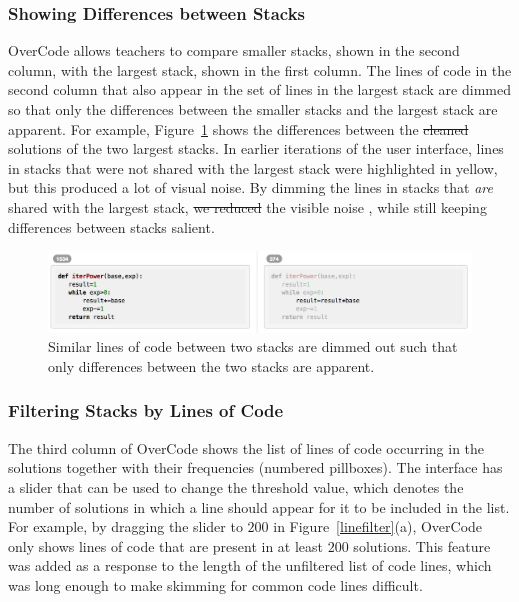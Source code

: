 \documentclass[12pt,twoside]{mitthesis}
\providecommand{\DIFaddtex}[1]{{\protect\color{blue}\uwave{#1}}} %
\providecommand{\DIFdeltex}[1]{{\protect\color{red}\sout{#1}}}                      %
\providecommand{\DIFaddbegin}{} %
\providecommand{\DIFaddend}{} %
\providecommand{\DIFdelbegin}{} %
\providecommand{\DIFdelend}{} %
\providecommand{\DIFadd}[1]{\texorpdfstring{\DIFaddtex{#1}}{#1}} %
\providecommand{\DIFdel}[1]{\texorpdfstring{\DIFdeltex{#1}}{}} %
\begin{document}
{{{{{{{{{{\subsubsection{Showing Differences between Stacks} OverCode allows teachers to compare smaller stacks, shown in the second column, with the largest stack, shown in the first column. The lines of code in the second column that also appear in the set of lines in the largest stack are dimmed so that only the differences between the smaller stacks and the largest stack are apparent. For example, Figure~\ref{stackdifferences} shows the differences between the \DIFdelbegin \DIFdel{cleaned }\DIFdelend \DIFaddbegin \DIFadd{platonic }\DIFaddend solutions of the two largest stacks. In earlier iterations of the user interface, lines in stacks that were not shared with the largest stack were highlighted in yellow, but this produced a lot of visual noise. By dimming the lines in stacks that \textit{are} shared with the largest stack, \DIFdelbegin \DIFdel{we reduced }\DIFdelend the visible noise \DIFaddbegin \DIFadd{is reduced}\DIFaddend , while still keeping differences between stacks salient.

\begin{figure}
\centering
\includegraphics[scale=0.42]{Body/figures/overcode/lineFadingScreenshot}
\caption{Similar lines of code between two stacks are dimmed out such that only differences between the two stacks are apparent.}
\label{stackdifferences}
\end{figure}



\subsubsection{Filtering Stacks by Lines of Code} The third column of OverCode shows the list of lines of code occurring in the solutions together with their frequencies (numbered pillboxes). The interface has a slider that can be used to change the threshold value, which denotes the number of solutions in which a line should appear for it to be included in the list. For example, by dragging the slider to $200$ in Figure~\ref{linefilter}(a), OverCode only shows lines of code that are present in at least $200$ solutions. This feature was added as a response to the length of the unfiltered list of code lines, which was long enough to make skimming for common code lines difficult.

}}}}}}}}}}
\end{document}
